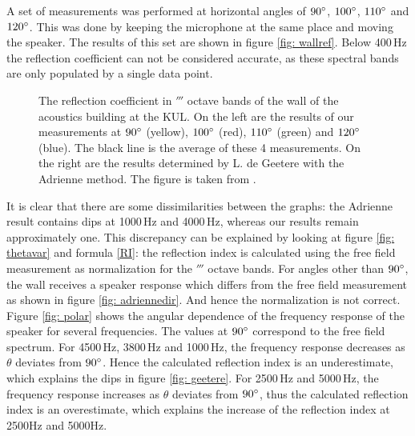 A set of measurements was performed at horizontal angles of $90^{\circ}$, $100^{\circ}$, $110^{\circ}$ and $120^{\circ}$. This was done by keeping the microphone at the same place and moving the speaker. The results of this set are shown in figure \ref{fig: wallref}. Below 400\,Hz the reflection coefficient can not be considered accurate, as these spectral bands are only populated by a single data point.


\begin{figure}[h!]
  \centering
  \caption{The reflection coefficient in $\third$ octave bands of the wall of the acoustics building at the KUL. On the left are the results of our measurements at $90^{\circ}$ (yellow), $100^{\circ}$ (red), $110^{\circ}$ (green) and $120^{\circ}$ (blue). The black line is the average of these 4 measurements. On the right are the results determined by L. de Geetere with the Adrienne method. The figure is taken from \cite[p.68]{Geetere}.}
  \label{fig: reflection}
\end{figure}




It is clear that there are some dissimilarities between the graphs: the Adrienne result contains dips at 1000\,Hz and 4000\,Hz, whereas our results remain approximately one. This discrepancy can be explained by looking at figure \ref{fig: thetavar} and formula \ref{RI}: the reflection index is calculated using the free field measurement as normalization for the $\third$ octave bands. For angles other than $90^{\circ}$, the wall receives a  speaker response which differs from the free field measurement as shown in figure \ref{fig: adriennedir}. And hence the normalization is not correct. Figure \ref{fig: polar} shows the angular dependence of the frequency response of the speaker for several frequencies. The values at $90^{\circ}$ correspond to the free field spectrum. For 4500\,Hz, 3800\,Hz and 1000\,Hz, the frequency response decreases as $\theta$ deviates from $90^{\circ}$. Hence the calculated reflection index is an underestimate, which explains the dips in figure \ref{fig: geetere}. For 2500\,Hz and 5000\,Hz, the frequency response increases as $\theta$ deviates from $90^{\circ}$, thus the calculated reflection index is an overestimate, which explains the increase of the reflection index at 2500Hz and 5000Hz. 



